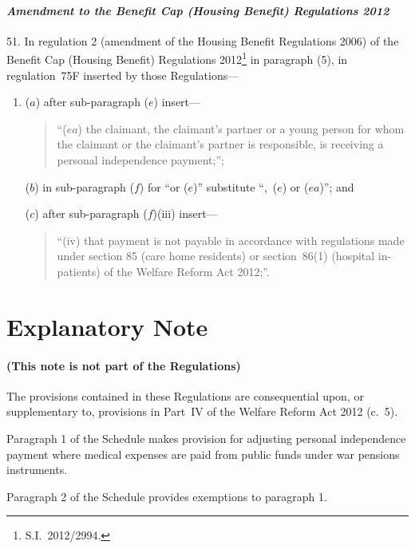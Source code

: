 \documentclass[12pt,a4paper]{article}
\begin{document}
\subsection*{\itshape Amendment to the Benefit Cap (Housing Benefit) Regulations 2012}

51.  In regulation 2 (amendment of the Housing Benefit Regulations 2006) of the Benefit Cap (Housing Benefit) Regulations 2012\footnote{S.I.~2012/2994.} in paragraph (5), in regulation~75F inserted by those Regulations—
\begin{enumerate}\item[]
($a$) after sub-paragraph ($e$)  insert—
\begin{quotation}
“($ea$) the claimant, the claimant’s partner or a young person for whom the claimant or the claimant’s partner is responsible, is receiving a personal independence payment;”;
\end{quotation}

($b$) in sub-paragraph ($f$)  for “or ($e$)” substitute “,~($e$)  or ($ea$)”; and

($c$) after sub-paragraph ($f$)(iii)  insert—
\begin{quotation}
“(iv) that payment is not payable in accordance with regulations made under section 85 (care home residents) or section~86(1) (hospital in-patients) of the Welfare Reform Act 2012;”.
\end{quotation}
\end{enumerate}

\part{Explanatory Note}

\renewcommand\parthead{— Explanatory Note}

\subsection*{(This note is not part of the Regulations)}

The provisions contained in these Regulations are consequential upon, or supplementary to, provisions in Part~IV of the Welfare Reform Act 2012 (c.~5).

Paragraph 1 of the Schedule makes provision for adjusting personal independence payment where medical expenses are paid from public funds under war pensions instruments.

Paragraph 2 of the Schedule provides exemptions to paragraph 1.
\end{document}
